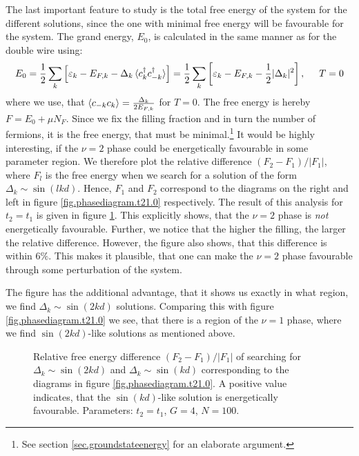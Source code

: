 The last important feature to study is the total free energy of the system for the different solutions, since the one with minimal free energy will be favourable for the system. The grand energy, $E_0$, is calculated in the same manner as for the double wire using:
\begin{equation}
E_0 = \frac{1}{2}\sum_k \left[\varepsilon_k - E_{F,k} - \Delta_k\braket{c^\dagger_{k}c^\dagger_{-k}}\right] = \frac{1}{2}\sum_k \left[\varepsilon_k - E_{F,k} - \frac{1}{2}|\Delta_k|^2\right], \hspace{0.5cm} T = 0
\label{eq.groundstategrandenergy.sumformula}
\end{equation}
where we use, that $\braket{c_{-k}c_k} = \frac{\Delta_k}{2E_{F,k}}$ for $T = 0$. The free energy is hereby $F = E_0 + \mu N_F$. Since we fix the filling fraction and in turn the number of fermions, it is the free energy, that must be minimal.\footnote{See section \ref{sec.groundstateenergy} for an elaborate argument.}  It would be highly interesting, if the $\nu = 2$ phase could be energetically favourable in some parameter region. We therefore plot the relative difference $(F_2 - F_1)/|F_1|$, where $F_l$ is the free energy when we search for a solution of the form $\Delta_k \sim \sin(lkd)$. Hence, $F_1$ and $F_2$ correspond to the diagrams on the right and left in figure \ref{fig.phasediagram.t21.0} respectively. The result of this analysis for $t_2 = t_1$ is given in figure \ref{fig.energydifference.t21.0}. This explicitly shows, that the $\nu = 2$ phase is \textit{not} energetically favourable. Further, we notice that the higher the filling, the larger the relative difference. However, the figure also shows, that this difference is within $6\%$. This makes it plausible, that one can make the $\nu = 2$ phase favourable through some perturbation of the system. 

The figure has the additional advantage, that it shows us exactly in what region, we find $\Delta_k \sim \sin(2kd)$ solutions. Comparing this with figure \ref{fig.phasediagram.t21.0} we see, that there is a region of the $\nu = 1$ phase, where we find $\sin(2kd)$-like solutions as mentioned above. 

\begin{figure}
\begin{center}

\caption{Relative free energy difference $(F_2 - F_1) / |F_1|$ of searching for $\Delta_k \sim \sin(2kd)$ and $\Delta_k\sim \sin(kd)$ corresponding to the diagrams in figure \ref{fig.phasediagram.t21.0}. A positive value indicates, that the $\sin(kd)$-like solution is energetically favourable. Parameters: $t_2 = t_1$, $G = 4$, $N = 100$. }
\label{fig.energydifference.t21.0}
\end{center}
\end{figure}

